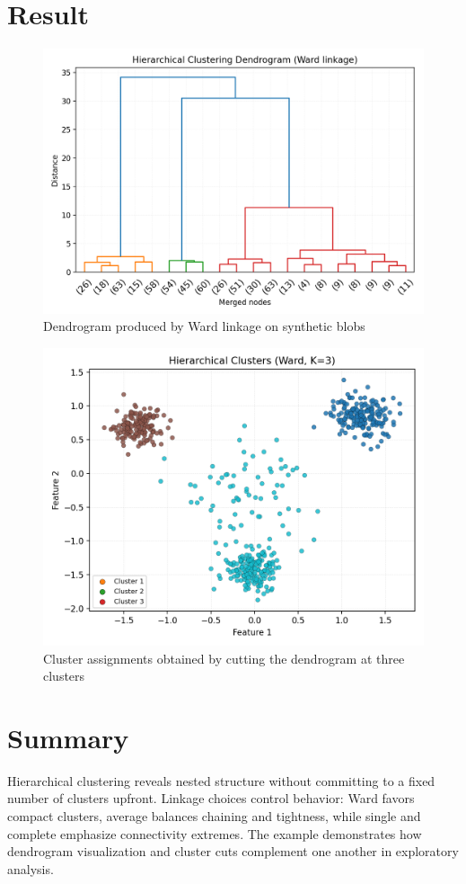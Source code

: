﻿\documentclass[12pt]{article}
\begin{document}
\section{Result}
\begin{figure}[H]
  \centering
  \includegraphics[width=0.85\linewidth]{hierarchical_dendrogram.png}
  \caption{Dendrogram produced by Ward linkage on synthetic blobs}
  \label{fig:hierarchical_dendrogram}
\end{figure}

\begin{figure}[H]
  \centering
  \includegraphics[width=0.82\linewidth]{hierarchical_clusters.png}
  \caption{Cluster assignments obtained by cutting the dendrogram at three clusters}
  \label{fig:hierarchical_clusters}
\end{figure}

\FloatBarrier
\section{Summary}
Hierarchical clustering reveals nested structure without committing to a fixed number of clusters upfront. Linkage choices control behavior: Ward favors compact clusters, average balances chaining and tightness, while single and complete emphasize connectivity extremes. The example demonstrates how dendrogram visualization and cluster cuts complement one another in exploratory analysis.
\end{document}
